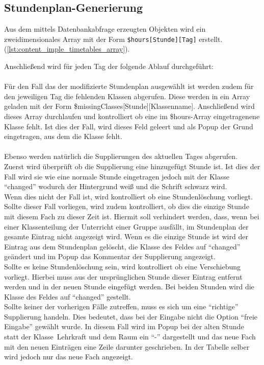 \subsection{Stundenplan-Generierung}

Aus dem mittels Datenbankabfrage erzeugten Objekten wird ein zweidimensionales Array mit der Form \texttt{\$hours[Stunde][Tag]} erstellt. (\autoref{lst:content_imple_timetables_array}).



Anschließend wird für jeden Tag der folgende Ablauf durchgeführt:\\\\

Für den Fall das der modifizierte Stundenplan ausgewählt ist werden zudem für den jeweiligen Tag die fehlenden Klassen abgerufen. Diese werden in ein Array geladen mit der Form \$missingClasses[Stunde][Klassenname]. Anschließend wird dieses Array durchlaufen und kontrolliert ob eine im \$hours-Array eingetragenene Klasse fehlt. Ist dies der Fall, wird dieses Feld geleert und als Popup der Grund eingetragen, aus dem die Klasse fehlt. \\\\
Ebenso werden natürlich die Supplierungen des aktuellen Tages abgerufen. \\
Zuerst wird überprüft ob die Supplierung eine hinzugefügt Stunde ist. Ist dies der Fall wird sie wie eine normale Stunde eingetragen jedoch mit der Klasse \enquote{changed} wodurch der Hintergrund weiß und die Schrift schwarz wird.\\
Wenn dies nicht der Fall ist, wird kontrolliert ob eine Stundenlöschung vorliegt. Sollte dieser Fall vorliegen, wird zudem kontrolliert, ob dies die einzige Stunde mit diesem Fach zu dieser Zeit ist. Hiermit soll verhindert werden, dass, wenn bei einer Klassenteilung der Unterricht einer Gruppe ausfällt, im Stundenplan der gesamte Eintrag nicht angezeigt wird. Wenn es die einzige Stunde ist wird der Eintrag aus dem Stundenplan gelöscht, die Klasse des Feldes auf \enquote{changed} geändert und im Popup das Kommentar der Supplierung angezeigt.\\
Sollte es keine Stundenlöschung sein, wird kontrolliert ob eine Verschiebung vorliegt. Hierbei muss aus der ursprünglichen Stunde dieser Eintrag entfernt werden und in der neuen Stunde eingefügt werden. Bei beiden Stunden wird die Klasse des Feldes auf \enquote{changed} gestellt.\\
Sollte keiner der vorherigen Fälle zutreffen, muss es sich um eine \enquote{richtige} Supplierung handeln. Dies bedeutet, dass bei der Eingabe nicht die Option \enquote{freie Eingabe} gewählt wurde. In diesem Fall wird im Popup bei der alten Stunde statt der Klasse\ Lehrkraft und dem Raum ein \enquote{-} dargestellt und das neue Fach mit den neuen Einträgen eine Zeile darunter geschrieben. In der Tabelle selber wird jedoch nur das neue Fach angezeigt.

